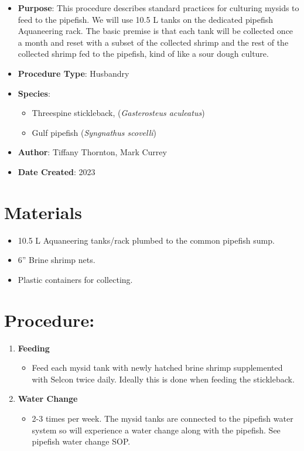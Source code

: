 \documentclass[
  letterpaper,
  DIV=11,
  numbers=noendperiod]{scrreprt}
\providecommand{\tightlist}{%
  \setlength{\itemsep}{0pt}\setlength{\parskip}{0pt}}\usepackage{longtable,booktabs,array}
\begin{document}
\begin{itemize}
\tightlist
\item
  \textbf{Purpose}: This procedure describes standard practices for
  culturing mysids to feed to the pipefish. We will use 10.5 L tanks on
  the dedicated pipefish Aquaneering rack. The basic premise is that
  each tank will be collected once a month and reset with a subset of
  the collected shrimp and the rest of the collected shrimp fed to the
  pipefish, kind of like a sour dough culture.
\item
  \textbf{Procedure Type}: Husbandry
\item
  \textbf{Species}:

  \begin{itemize}
  \tightlist
  \item
    Threespine stickleback, (\emph{Gasterosteus aculeatus})
  \item
    Gulf pipefish (\emph{Syngnathus scovelli})
  \end{itemize}
\item
  \textbf{Author}: Tiffany Thornton, Mark Currey
\item
  \textbf{Date Created}: 2023
\end{itemize}

\hypertarget{materials-34}{%
\section{Materials}\label{materials-34}}

\begin{itemize}
\tightlist
\item
  10.5 L Aquaneering tanks/rack plumbed to the common pipefish sump.
\item
  6'' Brine shrimp nets.
\item
  Plastic containers for collecting.
\end{itemize}

\hypertarget{procedure-34}{%
\section{Procedure:}\label{procedure-34}}

\begin{enumerate}
\def\labelenumi{\arabic{enumi}.}
\tightlist
\item
  \textbf{Feeding}

  \begin{itemize}
  \tightlist
  \item
    Feed each mysid tank with newly hatched brine shrimp supplemented
    with Selcon twice daily. Ideally this is done when feeding the
    stickleback.
  \end{itemize}
\item
  \textbf{Water Change}

  \begin{itemize}
  \tightlist
  \item
    2-3 times per week. The mysid tanks are connected to the pipefish
    water system so will experience a water change along with the
    pipefish. See pipefish water change SOP.
  \end{itemize}
\end{enumerate}
\end{document}
